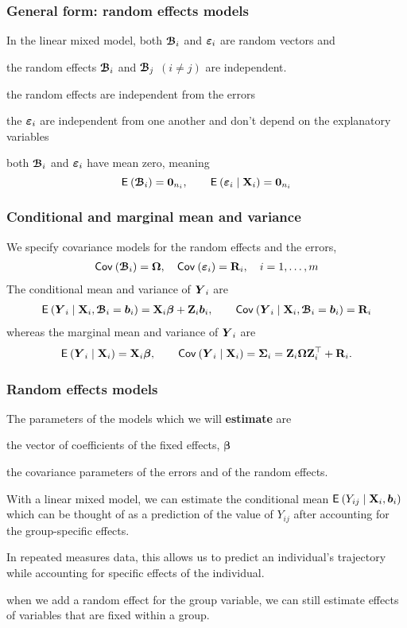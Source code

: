 \documentclass{beamer}
\begin{document}
\begin{frame}
\frametitle{General form: random effects models}
In the linear mixed model, both $\boldsymbol {\mathcal{B}}_i$ and $\boldsymbol {\varepsilon}_i$ are random vectors and 
\bi
\item the random effects $\boldsymbol {\mathcal{B}}_i$ and $\boldsymbol {\mathcal{B}}_j$ $(i \neq j)$ are independent.
\item the random effects are independent from the errors
\item the $\boldsymbol {\varepsilon}_i$ are independent from one another and don't depend on the explanatory variables
\item both $\boldsymbol {\mathcal{B}}_i$ and $\boldsymbol {\varepsilon}_i$ have mean zero, meaning \[{\mathsf E}_{}\left(\boldsymbol {\mathcal{B}}_i\right)=\boldsymbol {0}_{n_i}, \qquad {\mathsf E}_{}\left(\boldsymbol {\varepsilon}_i \mid \mathbf{X}_i\right)=\boldsymbol {0}_{n_i}\]
\ei
\end{frame}
\begin{frame}
\frametitle{Conditional and marginal mean and variance}
We specify covariance models for the random effects and the errors,
\begin{align*}
{\mathsf{Cov}_{}}\left(\boldsymbol {\mathcal{B}}_i\right)=\boldsymbol {\Omega}, \quad {\mathsf{Cov}_{}}\left(\boldsymbol {\varepsilon}_i\right)=\mathbf{R}_i, \quad i=1, \ldots, m
\end{align*}
The \alert{conditional} mean and variance of $\boldsymbol {Y}_i$ are
\begin{align*}
{\mathsf E}_{}\left(\boldsymbol {Y}_i \mid \mathbf{X}_i,\boldsymbol {\mathcal{B}}_i=\boldsymbol {b}_i\right) = \mathbf{X}_i \boldsymbol {\beta} + \mathbf{Z}_i \boldsymbol {b}_i, \qquad {\mathsf{Cov}_{}}\left(\boldsymbol {Y}_i \mid \mathbf{X}_i, \boldsymbol {\mathcal{B}}_i=\boldsymbol {b}_i\right) = \mathbf{R}_i
\end{align*}
whereas the \alert{marginal} mean and variance of $\boldsymbol {Y}_i$ are
\begin{align*}
{\mathsf E}_{}\left(\boldsymbol {Y}_i \mid \mathbf{X}_i\right) = \mathbf{X}_i \boldsymbol {\beta}, \qquad {\mathsf{Cov}_{}}\left(\boldsymbol {Y}_i \mid \mathbf{X}_i\right) = \boldsymbol {\Sigma}_i=\mathbf{Z}_i \boldsymbol {\Omega}\mathbf{Z}_i^\top+\mathbf{R}_i.
\end{align*}
\end{frame}
\begin{frame}[fragile]
\frametitle{Random effects models}
The \alert{parameters} of the models which we will \textbf{estimate} are
\bi \item the vector of coefficients of the fixed effects, $\boldsymbol{\beta}$
\item the covariance parameters of the errors and of the random effects.
\ei

\bi
\item With a linear mixed model, we can estimate the conditional mean ${\mathsf E}_{}\left(Y_{ij}\mid \mathbf{X}_i, \boldsymbol {b}_i\right)$  which can be thought of as a \alert{prediction} of the value of $Y_{ij}$ after accounting for the group-specific effects. 
\item In repeated measures data, this allows us to predict an individual's trajectory
while accounting for specific effects of the individual.
\item when we add a random effect for the group variable, we can still estimate effects of variables that are fixed within a group.
\ei
\end{frame}
\end{document}
